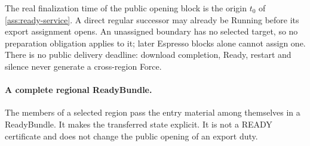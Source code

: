 \documentclass[11pt,a4paper]{article}
\begin{document}
The real finalization time of the public opening block is the origin
$t_0$ of \cref{ass:ready-service}. A direct regular successor may already
be Running before its export assignment opens. An unassigned boundary has
no selected target, so no preparation obligation applies to it; later
Espresso blocks alone cannot assign one. There is
no public delivery deadline: download completion, Ready, restart and
silence never generate a cross-region Force.


\paragraph{A complete regional ReadyBundle.}
\label{sec:ready-bundle}
The members of a selected region pass the entry material among themselves
in a ReadyBundle. It makes the transferred state explicit. It is not a
READY certificate and does not change the public opening of an export
duty.
\end{document}
